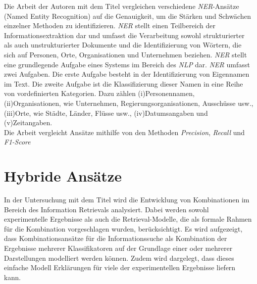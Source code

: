 Die Arbeit der Autoren \citeauthor{mansouri2008named} mit dem Titel \cite{mansouri2008named} vergleichen verschiedene \emph{NER}-Ansätze (Named Entity Recognition) auf die Genauigkeit, um die Stärken und Schwächen einzelner Methoden zu identifizieren. \emph{NER} stellt einen Teilbereich der Informationsextraktion dar und umfasst die Verarbeitung sowohl strukturierter als auch unstrukturierter Dokumente und die Identifizierung von Wörtern, die sich auf Personen, Orte, Organisationen und Unternehmen beziehen. \emph{NER} stellt eine grundlegende Aufgabe eines Systems im Bereich des \emph{NLP} dar. \emph{NER} umfasst zwei Aufgaben. Die erste Aufgabe besteht in der Identifizierung von Eigennamen im Text. Die zweite Aufgabe ist die Klassifizierung dieser Namen in eine Reihe von vordefinierten Kategorien. Dazu zählen (i)Personennamen, (ii)Organisationen, wie Unternehmen, Regierungsorganisationen, Ausschüsse usw., (iii)Orte, wie Städte, Länder, Flüsse usw., (iv)Datumsangaben und (v)Zeitangaben.\\
Die Arbeit vergleicht Ansätze mithilfe von den Methoden \emph{Precision}, \emph{Recall} und \emph{F1-Score}


\section{Hybride Ansätze}
In der Untersuchung mit dem Titel \cite{croft2000combining} wird die Entwicklung von Kombinationen im Bereich des Information Retrievals analysiert. Dabei werden sowohl experimentelle Ergebnisse als auch die Retrieval-Modelle, die als formale Rahmen für die Kombination vorgeschlagen wurden, berücksichtigt. Es wird aufgezeigt, dass Kombinationsansätze für die Informationssuche als Kombination der Ergebnisse mehrerer Klassifikatoren auf der Grundlage einer oder mehrerer Darstellungen modelliert werden können. Zudem wird dargelegt, dass dieses einfache Modell Erklärungen für viele der experimentellen Ergebnisse liefern kann.\\

